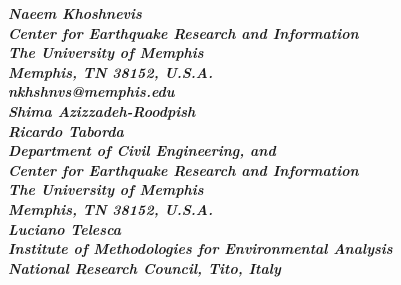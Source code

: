 \documentclass[twocolumn,twoside,fleqn]{article}
\begin{document}
%    

\makeatletter
\if@twocolumn
    \pagestyle{fancy}
\fi
\makeatother

\maketitle
\makeatletter
\if@twocolumn
    \thispagestyle{fancy}
\fi
\makeatother


\noindent




\makeatletter
\if@twocolumn
    \vspace{3ex}
    \noindent\raggedleft\it\bf
	Naeem Khoshnevis\\
	Center for Earthquake Research and Information\\
	The University of Memphis\\
	Memphis, TN 38152, U.S.A.\\
	nkhshnvs@memphis.edu\\
	\vspace{2ex}
	Shima Azizzadeh-Roodpish\\
	Ricardo Taborda\\
	Department of Civil Engineering, and\\
	Center for Earthquake Research and Information\\
	The University of Memphis\\
	Memphis, TN 38152, U.S.A.\\
	\vspace{2ex}
	Luciano Telesca\\
	Institute of Methodologies for Environmental Analysis\\
	National Research Council, Tito, Italy\\
	\vspace{2ex}
\fi
\makeatother
\end{document}

